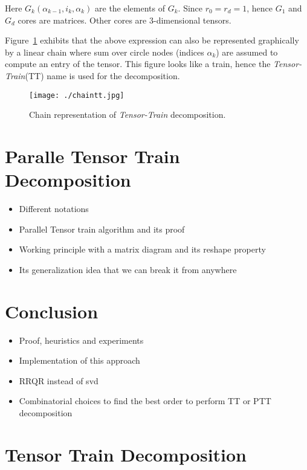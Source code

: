 \documentclass[runningheads]{llncs}
\newcommand{\ttrain}{{\it Tensor-Train}\xspace}
\begin{document}
\noindent Here $G_k(\alpha_{k-1}, i_k, \alpha_k)$ are the elements of $G_k$. Since $r_0=r_d=1$, hence $G_1$ and $G_d$ cores are matrices. Other cores are $3$-dimensional tensors.

\noindent Figure~\ref{fig:ttrainchain} exhibits that the above expression can also be represented graphically by a linear chain where sum over circle nodes (indices $\alpha_k$) are assumed to compute an entry of the tensor. This figure looks like a train, hence the \ttrain (TT) name is used for the decomposition. 

\begin{figure}[htb]
	\begin{center}
		\texttt{[image: ./chaintt.jpg]}
		\caption{Chain representation of \ttrain decomposition.\label{fig:ttrainchain}}
	\end{center}
\end{figure}

\section{Paralle Tensor Train Decomposition}
\label{sec:ptt}
\begin{itemize}
	\item Different notations
	\item Parallel Tensor train algorithm and its proof
	\item Working principle with a matrix diagram and its reshape property
	\item Its generalization idea that we can break it from anywhere
\end{itemize}


\section{Conclusion}
\label{sec:conclusion}
\begin{itemize}
	\item Proof, heuristics and experiments
	\item Implementation of this approach
	\item RRQR instead of svd
	\item Combinatorial choices to find the best order to perform TT or PTT decomposition
\end{itemize}




%
\section{Tensor Train Decomposition}
\label{sec:tt_sequential}
\end{document}
